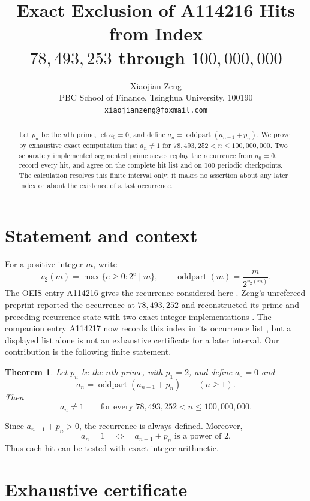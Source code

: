\documentclass[11pt]{article}
\title{Exact Exclusion of A114216 Hits from Index\\
  $78{,}493{,}253$ through $100{,}000{,}000$}
\author{Xiaojian Zeng\\
  PBC School of Finance, Tsinghua University, 100190\\
  \texttt{xiaojianzeng@foxmail.com}}
\date{}
\newtheorem{theorem}{Theorem}
\begin{document}
\maketitle

\begin{abstract}
Let $p_n$ be the $n$th prime, let $a_0=0$, and define
$a_n=\operatorname{oddpart}(a_{n-1}+p_n)$.  We prove by exhaustive exact
computation that $a_n\ne1$ for
$78{,}493{,}252<n\le100{,}000{,}000$.  Two separately implemented segmented
prime sieves replay the recurrence from $a_0=0$, record every hit, and agree
on the complete hit list and on 100 periodic checkpoints.  The calculation
resolves this finite interval only; it makes no assertion about any later
index or about the existence of a last occurrence.
\end{abstract}

\section{Statement and context}

For a positive integer $m$, write
\[
 v_2(m)=\max\{e\ge0:2^e\mid m\},\qquad
 \operatorname{oddpart}(m)=\frac{m}{2^{v_2(m)}}.
\]
The OEIS entry A114216 gives the recurrence considered here
\cite{oeisA114216}.  Zeng's unrefereed preprint reported the occurrence at
$78{,}493{,}252$ and reconstructed its prime and preceding recurrence state
with two exact-integer implementations \cite{Zeng2026SSRN7395098}.  The
companion entry A114217 now records this index in its occurrence list
\cite{oeisA114217}, but a displayed list alone is not an exhaustive
certificate for a later interval.  Our contribution is the following finite
statement.

\begin{theorem}\label{thm:main}
Let $p_n$ be the $n$th prime, with $p_1=2$, and define $a_0=0$ and
\[
 a_n=\operatorname{oddpart}(a_{n-1}+p_n)\qquad(n\ge1).
\]
Then
\[
 a_n\ne1
 \qquad\text{for every }78{,}493{,}252<n\le100{,}000{,}000.
\]
\end{theorem}

Since $a_{n-1}+p_n>0$, the recurrence is always defined.  Moreover,
\begin{equation}\label{eq:hit}
 a_n=1\quad\Longleftrightarrow\quad
 a_{n-1}+p_n\text{ is a power of }2.
\end{equation}
Thus each hit can be tested with exact integer arithmetic.

\section{Exhaustive certificate}
\end{document}
